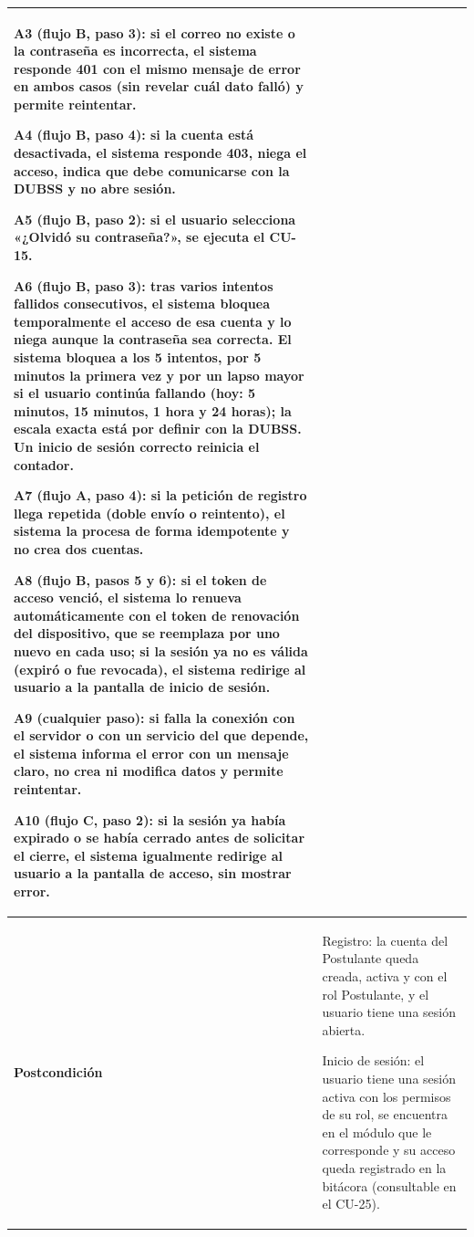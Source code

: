 \begin{longtable}{>{\raggedright\arraybackslash}p{2.9cm} >{\raggedright\arraybackslash}p{12.6cm}}
\begin{cuvin}
    \item A3 (flujo B, paso 3): si el correo no existe o la contraseña es incorrecta, el sistema responde 401 con el mismo mensaje de error en ambos casos (sin revelar cuál dato falló) y permite reintentar.
    \item A4 (flujo B, paso 4): si la cuenta está desactivada, el sistema responde 403, niega el acceso, indica que debe comunicarse con la DUBSS y no abre sesión.
    \item A5 (flujo B, paso 2): si el usuario selecciona «¿Olvidó su contraseña?», se ejecuta el CU-15.
    \item A6 (flujo B, paso 3): tras varios intentos fallidos consecutivos, el sistema bloquea temporalmente el acceso de esa cuenta y lo niega aunque la contraseña sea correcta. El sistema bloquea a los 5 intentos, por 5 minutos la primera vez y por un lapso mayor si el usuario continúa fallando (hoy: 5 minutos, 15 minutos, 1 hora y 24 horas); la escala exacta está por definir con la DUBSS. Un inicio de sesión correcto reinicia el contador.
    \item A7 (flujo A, paso 4): si la petición de registro llega repetida (doble envío o reintento), el sistema la procesa de forma idempotente y no crea dos cuentas.
    \item A8 (flujo B, pasos 5 y 6): si el token de acceso venció, el sistema lo renueva automáticamente con el token de renovación del dispositivo, que se reemplaza por uno nuevo en cada uso; si la sesión ya no es válida (expiró o fue revocada), el sistema redirige al usuario a la pantalla de inicio de sesión.
    \item A9 (cualquier paso): si falla la conexión con el servidor o con un servicio del que depende, el sistema informa el error con un mensaje claro, no crea ni modifica datos y permite reintentar.
    \item A10 (flujo C, paso 2): si la sesión ya había expirado o se había cerrado antes de solicitar el cierre, el sistema igualmente redirige al usuario a la pantalla de acceso, sin mostrar error.
\end{cuvin} \\
\midrule
\textbf{Postcondición} & \vspace{-\baselineskip}\begin{cuvin}
    \item Registro: la cuenta del Postulante queda creada, activa y con el rol Postulante, y el usuario tiene una sesión abierta.
    \item Inicio de sesión: el usuario tiene una sesión activa con los permisos de su rol, se encuentra en el módulo que le corresponde y su acceso queda registrado en la bitácora (consultable en el CU-25).

\end{cuvin}
\end{longtable}
